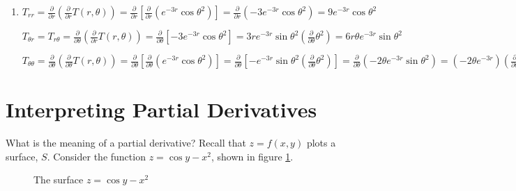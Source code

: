 \begin{Answer}[ref = second]
\begin{enumerate}
\item $T_{rr} = \frac{\partial}{\partial r} \left( \frac{\partial}{\partial r} 
T(r, \theta) \right) = \frac{\partial}{\partial r} \left[ \frac{\partial}{
\partial r} \left( e^{-3r} \cos{\theta^2} \right) \right] = \frac{\partial}{
\partial r} \left( -3e^{-3r} \cos{ \theta ^2 } \right) = 9e^{-3r} \cos{ 
\theta^2 }$

$T_{\theta r} = T_{r \theta} = \frac{\partial}{\partial \theta} \left( \frac{
\partial}{\partial r} T(r, \theta) \right) = \frac{\partial}{\partial \theta} 
\left[ -3e^{-3r} \cos{ \theta^2} \right] = 3re^{-3r} \sin{ \theta^2} \left( 
\frac{\partial}{\partial \theta} \theta^2 \right) = 6r\theta e^{-3r} \sin{ 
\theta^2}$

$T_{\theta \theta} = \frac{\partial}{\partial \theta} \left( \frac{\partial}{
\partial \theta} T(r, \theta) \right) = \frac{\partial}{\partial \theta} \left[
\frac{\partial}{\partial \theta} \left( e^{-3r}\cos{ \theta^2} \right) \right] 
= \frac{\partial}{\partial \theta} \left[ -e^{-3r} \sin{ \theta^2} \left( 
\frac{\partial}{\partial \theta} \theta^2 \right) \right] = \frac{\partial}{
\partial \theta} \left( -2 \theta e^{-3r} \sin{ \theta^2} \right) = \left(-2
\theta e^{-3r} \right) \left( \frac{\partial}{\partial \theta} \sin{ \theta ^2}
\right) + \left(\sin{\theta^2} \right) \left[ \frac{\partial}{\partial \theta} 
\left( -2\theta e^{-3r} \right) \right] = \left( -2 \theta e^{-3r} \right) 
\left( \cos{ \theta^2} \right) \left( \frac{\partial}{\partial \theta} \theta^2
\right) + \left( \sin{ \theta^2 } \right) \left( -2e^{-3r} \right) = -4\theta^2
e^{-3r} \cos{\theta^2} - 2e^{-3r}\sin{\theta^2}$
\end{enumerate}
\end{Answer}

\section{Interpreting Partial Derivatives}
What is the meaning of a partial derivative? Recall that $z = f(x, y)$ plots a 
surface, $S$. Consider the function $z = \cos{y} - x^2$, shown in figure 
\ref{fig:surface}.

\begin{figure}[htbp]
    \centering
    \caption{The surface $z = \cos{y} - x^2$}
    \label{fig:surface}
\end{figure}

